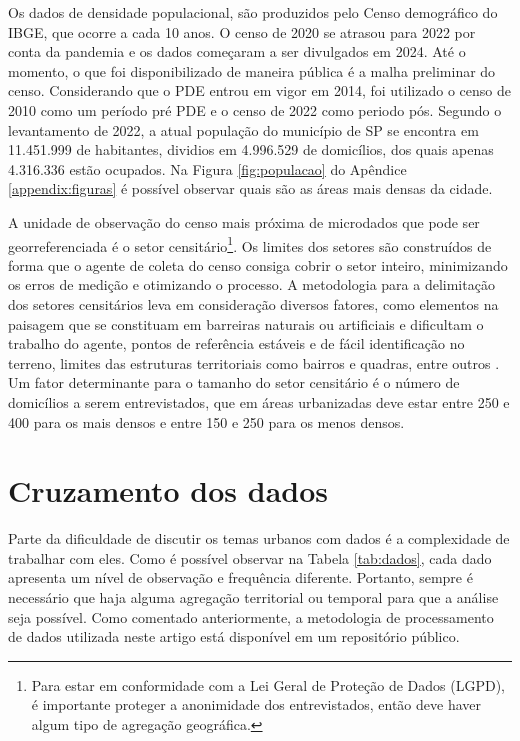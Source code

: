 Os dados de densidade populacional, são produzidos pelo Censo demográfico do IBGE, que ocorre a cada 10 anos. O censo de 2020 se atrasou para 2022 por conta da pandemia e os dados começaram a ser divulgados em 2024. Até o momento, o que foi disponibilizado de maneira pública é a malha preliminar do censo. Considerando que o PDE entrou em vigor em 2014, foi utilizado o censo de 2010 como um período pré PDE e o censo de 2022 como periodo pós. Segundo o levantamento de 2022, a atual população do município de SP se encontra em 11.451.999 de habitantes, dividios em 4.996.529 de domicílios, dos quais apenas 4.316.336 estão ocupados. Na Figura \ref{fig:populacao} do Apêndice \ref{appendix:figuras} é possível observar quais são as áreas mais densas da cidade. 


A unidade de observação do censo mais próxima de microdados que pode ser georreferenciada é o setor censitário\footnote{Para estar em conformidade com a Lei Geral de Proteção de Dados (LGPD), é importante proteger a anonimidade dos entrevistados, então deve haver algum tipo de agregação geográfica.}. Os limites dos setores são construídos de forma que o agente de coleta do censo consiga cobrir o setor inteiro, minimizando os erros de medição e otimizando o processo. A metodologia para a delimitação dos setores censitários leva em consideração diversos fatores, como elementos na paisagem que se constituam em barreiras naturais ou artificiais e dificultam o trabalho do agente, pontos de referência estáveis e de fácil identificação no terreno, limites das estruturas territoriais como bairros e quadras, entre outros \cite{IBGE2024}. Um fator determinante para o tamanho do setor censitário é o número de domicílios a serem entrevistados, que em áreas urbanizadas deve estar entre 250 e 400 para os mais densos e entre 150 e 250 para os menos densos.

\section{Cruzamento dos dados}
\label{sec:dadosCruz}

Parte da dificuldade de discutir os temas urbanos com dados é a complexidade de trabalhar com eles. Como é possível observar na Tabela \ref{tab:dados}, cada dado apresenta um nível de observação e frequência diferente. Portanto, sempre é necessário que haja alguma agregação territorial ou temporal para que a análise seja possível. Como comentado anteriormente, a metodologia de processamento de dados utilizada neste artigo está disponível em um repositório público.

